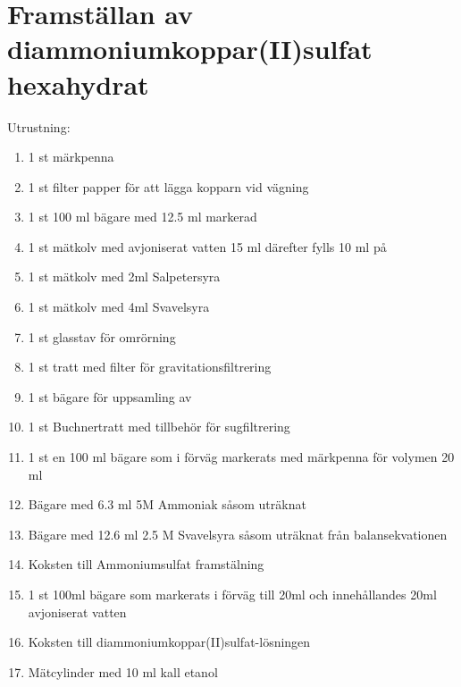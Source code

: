 \documentclass[./chem_exercises.tex]{subfiles}
\begin{document}



\section{Framställan av diammoniumkoppar(II)sulfat hexahydrat}
Utrustning:\\
\begin{enumerate}
\item 1 st märkpenna
\item 1 st filter papper för att lägga kopparn vid vägning
\item 1 st 100 ml bägare med 12.5 ml markerad
\item 1 st mätkolv med avjoniserat vatten 15 ml därefter fylls 10 ml på
\item 1 st mätkolv med 2ml Salpetersyra
\item 1 st mätkolv med 4ml Svavelsyra
\item 1 st glasstav för omrörning
\item 1 st tratt med filter för gravitationsfiltrering
\item 1 st bägare för uppsamling av 
\item 1 st Buchnertratt med tillbehör för sugfiltrering
\item 1 st en 100 ml bägare som i förväg markerats med
märkpenna för volymen 20 ml
\item Bägare med 6.3 ml 5M Ammoniak såsom uträknat
\item Bägare med 12.6 ml  2.5 M Svavelsyra såsom uträknat från balansekvationen
\item Koksten till Ammoniumsulfat framstälning
\item 1 st 100ml bägare som markerats i förväg till 20ml och innehållandes 20ml avjoniserat vatten
\item Koksten till diammoniumkoppar(II)sulfat-lösningen
\item Mätcylinder med 10 ml kall etanol



\end{enumerate}
\end{document}
